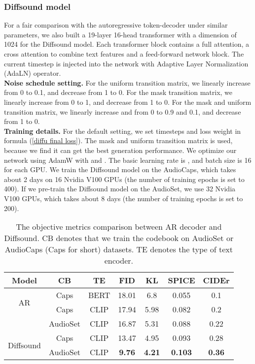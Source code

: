 \documentclass[lettersize,journal]{IEEEtran}
\begin{document}
\subsubsection{Diffsound model} For a fair comparison with the autoregressive token-decoder under similar parameters, we also built a 19-layer 16-head transformer with a dimension of 1024 for the Diffsound model. Each transformer block contains a full attention, a cross attention to combine text features and a feed-forward network block. The current timestep  is injected into the network with Adaptive Layer Normalization \cite{ba2016layer}(AdaLN) operator. \\
\textbf{Noise schedule setting.} For the uniform transition matrix, we linearly increase  from 0 to 0.1, and decrease  from 1 to 0. For the mask transition matrix, we linearly increase  from 0 to 1, and decrease  from 1 to 0. For the mask and uniform transition matrix, we linearly increase  and  from 0 to 0.9 and 0.1, and decrease  from 1 to 0.\\
\textbf{Training details.} For the default setting, we set timesteps  and loss weight  in formula (\ref{diffu final loss}). The mask and uniform transition matrix is used, because we find it can get the best generation performance. We optimize our network using AdamW \cite{loshchilov2017decoupled} with  and . The basic learning rate is , and batch size is 16 for each GPU. We train the Diffsound model on the AudioCaps, which takes about 2 days on 16 Nvidia V100 GPUs (the number of training epochs is set to 400). If we pre-train the Diffsound model on the AudioSet, we use 32 Nvidia V100 GPUs, which takes about 8 days (the number of training epochs is set to 200).
\begin{table}[t] \centering
\caption{The objective metrics comparison between AR decoder and Diffsound. CB denotes that we train the codebook on AudioSet or AudioCaps (Caps for short) datasets. TE denotes the type of text encoder.}
\label{tab:my-table2}
\begin{tabular}{ccccccc}
\hline
Model                      & CB &TE  & FID      & KL      & SPICE  & CIDEr  \\ \hline
\multirow{2}{*}{AR}        & Caps &BERT & 18.01     & 6.8   & 0.055      & 0.1  \\
                           & Caps &CLIP & 17.94     & 5.98   & 0.082      & 0.2  \\
                           & AudioSet &CLIP & 16.87    & 5.31   & 0.088      & 0.22  \\ \hline
\multirow{2}{*}{Diffsound} & Caps &CLIP & 13.47      & 4.95   & 0.093     & 0.28 \\
                           & AudioSet &CLIP  & \textbf{9.76} & \textbf{4.21}  & \textbf{0.103} & \textbf{0.36}   \\ \hline
\end{tabular}
\end{table}
\end{document}
